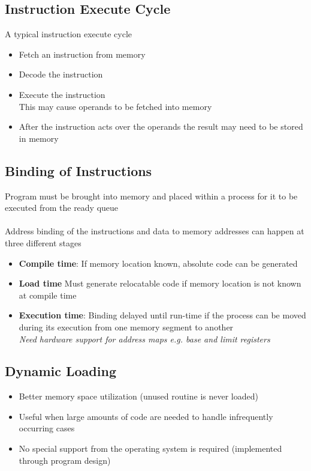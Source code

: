 \documentclass{article}[18pt]
\begin{document}
\subsection{Instruction Execute Cycle}
A typical instruction execute cycle
\begin{itemize}
	\item Fetch an instruction from memory
	\item Decode the instruction
	\item Execute the instruction\\
	This may cause operands to be fetched into memory
	\item After the instruction acts over the operands the result may need to be stored in memory
\end{itemize}
\subsection{Binding of Instructions}
Program must be brought into memory and placed within a process for it to be executed from the ready queue\\
\\
Address binding of the instructions and data to memory addresses can happen at three different stages
\begin{itemize}
	\item \textbf{Compile time}: If memory location known, absolute code can be generated
	\item \textbf{Load time} Must generate relocatable code if memory location is not known at compile time
	\item \textbf{Execution time}: Binding delayed until run-time if the process can be moved during its execution from one memory segment to another\\
	\textit{Need hardware support for address maps e.g. base and limit registers} 
\end{itemize}
\subsection{Dynamic Loading}
\begin{itemize}
	\item Better memory space utilization (unused routine is never loaded)\\
	\item Useful when large amounts of code are needed to handle infrequently occurring cases
	\item No special support from the operating system is required (implemented through program design)
\end{itemize}
\end{document}
